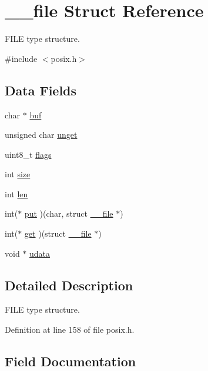 \hypertarget{struct____file}{}\section{\+\_\+\+\_\+file Struct Reference}
\label{struct____file}


F\+I\+LE type structure.  




{\ttfamily \#include $<$posix.\+h$>$}

\subsection*{Data Fields}
\begin{DoxyCompactItemize}
\item 
char $\ast$ \hyperlink{struct____file_a3e5a85ae919a90efbb7cb44ccb54fe46}{buf}
\item 
unsigned char \hyperlink{struct____file_a1d139ae3cb11a1fada469a49f7d3d3b6}{unget}
\item 
uint8\+\_\+t \hyperlink{struct____file_a8d11df8679502efee09740f97d7c277b}{flags}
\item 
int \hyperlink{struct____file_aff4a1ca8b6a12460812928afae81248d}{size}
\item 
int \hyperlink{struct____file_a30309efd13a75ed510bb2370debafaf8}{len}
\item 
int($\ast$ \hyperlink{struct____file_a01c8b217e42cc11b6a7f8429114e9d46}{put} )(char, struct \hyperlink{struct____file}{\+\_\+\+\_\+file} $\ast$)
\item 
int($\ast$ \hyperlink{struct____file_a2d816b077c3af0425344fe4b283dad33}{get} )(struct \hyperlink{struct____file}{\+\_\+\+\_\+file} $\ast$)
\item 
void $\ast$ \hyperlink{struct____file_abe6f3bdb4df4119277132eb3e13a4628}{udata}
\end{DoxyCompactItemize}


\subsection{Detailed Description}
F\+I\+LE type structure. 

Definition at line 158 of file posix.\+h.



\subsection{Field Documentation}
\mbox{\label{struct____file_a3e5a85ae919a90efbb7cb44ccb54fe46}} 
